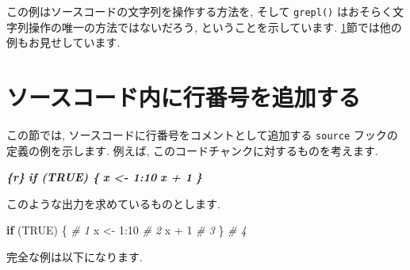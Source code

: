 \documentclass[
  11pt,
]{bxjsreport}
\newenvironment{Shaded}{\begin{snugshade}}{\end{snugshade}}
\newcommand{\CommentTok}[1]{\textcolor[rgb]{0.56,0.35,0.01}{\textit{#1}}}
\newcommand{\ConstantTok}[1]{\textcolor[rgb]{0.00,0.00,0.00}{#1}}
\newcommand{\ControlFlowTok}[1]{\textcolor[rgb]{0.13,0.29,0.53}{\textbf{#1}}}
\newcommand{\DecValTok}[1]{\textcolor[rgb]{0.00,0.00,0.81}{#1}}
\newcommand{\InformationTok}[1]{\textcolor[rgb]{0.56,0.35,0.01}{\textbf{\textit{#1}}}}
\newcommand{\NormalTok}[1]{#1}
\newcommand{\OtherTok}[1]{\textcolor[rgb]{0.56,0.35,0.01}{#1}}
\newcommand{\SpecialCharTok}[1]{\textcolor[rgb]{0.00,0.00,0.00}{#1}}
\begin{document}
この例はソースコードの文字列を操作する方法を, そして \texttt{grepl()} はおそらく文字列操作の唯一の方法ではないだろう, ということを示しています. \ref{hook-number}節では他の例もお見せしています.

\hypertarget{hook-number}{%
\section{ソースコード内に行番号を追加する}\label{hook-number}}

この節では, ソースコードに行番号をコメントとして追加する \texttt{source} フックの定義の例を示します. 例えば, このコードチャンクに対するものを考えます.

\begin{Shaded}
\begin{Highlighting}[]
\InformationTok{\textasciigrave{}\textasciigrave{}\textasciigrave{}\{r\}}
\InformationTok{if (TRUE) \{}
\InformationTok{  x \textless{}{-} 1:10}
\InformationTok{  x + 1}
\InformationTok{\}}
\InformationTok{\textasciigrave{}\textasciigrave{}\textasciigrave{}}
\end{Highlighting}
\end{Shaded}

このような出力を求めているものとします.

\begin{Shaded}
\begin{Highlighting}[numbers=left,,]
\ControlFlowTok{if}\NormalTok{ (}\ConstantTok{TRUE}\NormalTok{) \{    }\CommentTok{\# 1}
\NormalTok{  x }\OtherTok{\textless{}{-}} \DecValTok{1}\SpecialCharTok{:}\DecValTok{10}    \CommentTok{\# 2}
\NormalTok{  x }\SpecialCharTok{+} \DecValTok{1}        \CommentTok{\# 3}
\NormalTok{\}              }\CommentTok{\# 4}
\end{Highlighting}
\end{Shaded}

完全な例は以下になります.
\end{document}
